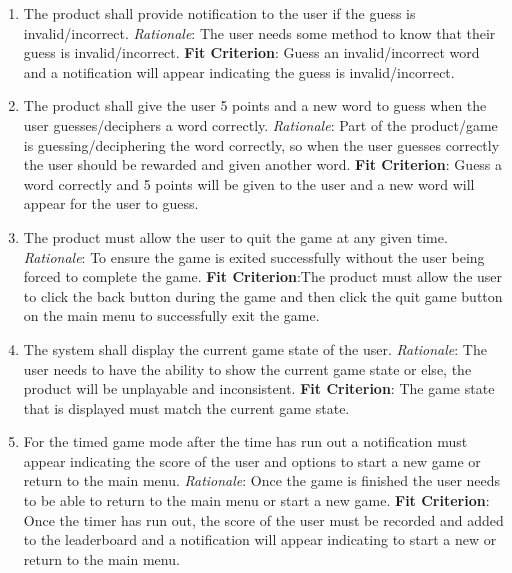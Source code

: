 \documentclass[12pt, titlepage]{article}
\begin{document}
\begin{enumerate}[{FR}1.]
	\item The product shall provide notification to the user if the guess is invalid/incorrect.
	{\newline \emph{Rationale}: The user needs some method to know that their guess is invalid/incorrect.
	\newline \textbf{Fit Criterion}: Guess an invalid/incorrect word and a notification will appear indicating the guess is invalid/incorrect.}
	
	\item The product shall give the user 5 points and a new word to guess when the user guesses/deciphers a word correctly.
	{\newline \emph{Rationale}: Part of the product/game is guessing/deciphering the word correctly, so when the user guesses correctly the user should be rewarded and given another word.
	\newline \textbf{Fit Criterion}:  Guess a word correctly and 5 points will be given to the user and a new word will appear for the user to guess.}
	
	\item The product must allow the user to quit the game at any given time.
	{\newline \emph{Rationale}: To ensure the game is exited successfully without the user being forced to complete the game.
	\newline \textbf{Fit Criterion}:The product must allow the user to click the back button during the game and then click the quit game button on the main menu to successfully exit the game. }
	
	\item The system shall display the current game state of the user.
	{\newline \emph{Rationale}: The user needs to have the ability to show the current game state or else, the product will be unplayable and inconsistent.
	\newline \textbf{Fit Criterion}: The game state that is displayed must match the current game state. }
	
	\item For the timed game mode after the time has run out a notification must appear indicating the score of the user and options to start a new game or return to the main menu.
	{\newline \emph{Rationale}: Once the game is finished the user needs to be able to return to the main menu or start a new game.
	\newline \textbf{Fit Criterion}: Once the timer has run out, the score of the user must be recorded and added to the leaderboard and a notification will appear indicating to start a new or return to the main menu. }
	

\end{enumerate}
\end{document}
